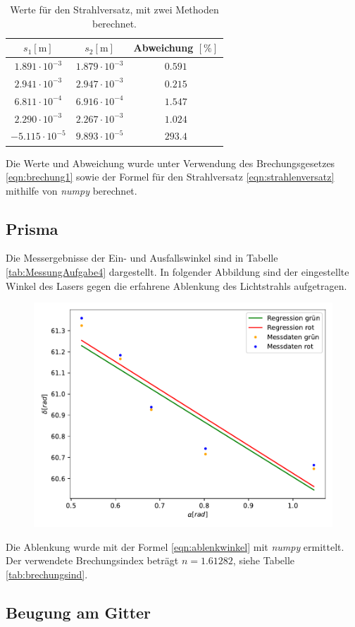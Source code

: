 \begin{table}
  \centering
  \caption{Werte für den Strahlversatz, mit zwei Methoden berechnet.}
  \label{tab:strahlversatzausw}
  \begin{tabular}
    {S S S}
    \toprule
    {$s_1 [\si{\meter}]$} & {$s_2 [\si{\meter}]$} & {Abweichung $[\si{\percent}]$} \\
    \midrule
     {$1.891 \cdot 10^{-3}$} & {$1.879 \cdot 10^{-3}$} & {$0.591$} \\
     {$2.941 \cdot 10^{-3}$} & {$2.947 \cdot 10^{-3}$} & {$0.215$} \\
     {$6.811 \cdot 10^{-4}$} & {$6.916 \cdot 10^{-4}$} & {$1.547$} \\
     {$2.290 \cdot 10^{-3}$} & {$2.267 \cdot 10^{-3}$} & {$1.024$} \\
    {$-5.115 \cdot 10^{-5}$} & {$9.893 \cdot 10^{-5}$} & {$293.4$} \\
    \bottomrule
  \end{tabular}
\end{table}
\noindent
Die Werte und Abweichung wurde unter Verwendung des Brechungsgesetzes \eqref{eqn:brechung1} sowie der Formel für den
Strahlversatz \eqref{eqn:strahlenversatz} mithilfe von \textit{numpy} berechnet.

\subsection{Prisma}
\label{sec:prismaauswertung}
Die Messergebnisse der Ein- und Ausfallswinkel sind in Tabelle \ref{tab:MessungAufgabe4} dargestellt. In folgender Abbildung sind der eingestellte Winkel des Lasers gegen die erfahrene Ablenkung des Lichtstrahls aufgetragen.
\begin{figure}[H]
  \centering
  \includegraphics[scale=0.7]{auswertung/plot4.pdf}
  \label{fig:plot4ausw}
\end{figure}
Die Ablenkung wurde mit der Formel \eqref{eqn:ablenkwinkel} mit \textit{numpy} ermittelt. Der verwendete Brechungsindex beträgt $n = 1.61282$, siehe Tabelle \ref{tab:brechungsind}.
\subsection{Beugung am Gitter}
\label{sec:beugungauswertung}

